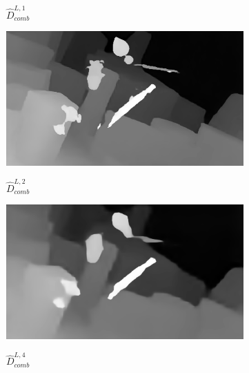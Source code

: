 \documentclass[10pt]{article}
\begin{document}
\begin{figure}[t]
{\begin{subfigure}[b]{0.28\textwidth}
        \vspace{-15pt}                
        \caption{$\hat{D}_{comb}^{L,1}$}
    \end{subfigure} 
    \hspace{0.001cm} 
    \begin{subfigure}[b]{0.28\textwidth}
        \includegraphics[width=\textwidth]{paper/latex/figures/pred_comb_1.png}\\
        \vspace{-15pt}      
        \caption{$\hat{D}_{comb}^{L,2}$}
    \end{subfigure} 
    \hspace{0.001cm} 
    \begin{subfigure}[b]{0.28\textwidth}
        \includegraphics[width=\textwidth]{paper/latex/figures/pred_comb_2.png}\\
        \vspace{-15pt}                      
        \caption{$\hat{D}_{comb}^{L,4}$}
    \end{subfigure} 
    \hspace{0.001cm} 
    \begin{subfigure}[b]{0.28\textwidth}

\end{subfigure}}
\end{figure}
\end{document}
